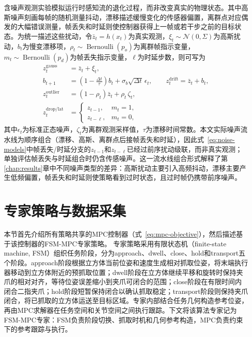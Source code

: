 含噪声观测实验模拟运行时感知流的退化过程，而非改变真实的物理状态。其中高斯噪声刻画每帧的随机测量抖动，漂移描述缓慢变化的传感器偏置，离群点对应偶发的大幅错误测量，帧丢失和时延则使控制器获得上一帧或若干步之前的目标状态。为统一描述这些扰动，令$\bar{z}_t=h(x_t)$为真实观测，$\xi_t\sim\mathcal{N}(0,\Sigma)$为高斯扰动，$b_t$为慢变漂移项，$\rho_t\sim\operatorname{Bernoulli}(p_o)$为离群帧指示变量，$m_t\sim\operatorname{Bernoulli}(p_d)$为帧丢失指示变量，$\ell$为时延步数，则可写为
\begin{align}
    z_t^{\mathrm{gauss}} &= \bar{z}_t+\xi_t, \\
    b_{t+1} &= \left(1-\frac{\Delta t}{\tau}\right)b_t+\sigma_b\sqrt{\Delta t}\,\epsilon_t,\qquad
        z_t^{\mathrm{drift}}=\bar{z}_t+b_t, \\
    z_t^{\mathrm{outlier}} &= (1-\rho_t)\bar{z}_t+\rho_t\,\zeta_t, \\
    z_t^{\mathrm{drop/lat}} &=
    \begin{cases}
        z_{t-1}, & m_t=1,\\
        z_{t-\ell}, & m_t=0,
    \end{cases}
    \label{eq:noise-models}
\end{align}
其中$\epsilon_t$为标准正态噪声，$\zeta_t$为离群观测采样值，$\tau$为漂移时间常数。本文实际噪声流水线为顺序组合（漂移、高斯、离群点后接帧丢失和时延），因此式~\eqref{eq:noise-models}中帧丢失/时延分支的$z_{t-1}$和$z_{t-\ell}$已经过前序扰动级联，而非真实观测；单独评估帧丢失与时延组合时仍含传感噪声。这一流水线组合形式解释了第\ref{chap:results}章中不同噪声类型的差异：高斯扰动主要引入高频抖动，漂移主要产生低频偏置，帧丢失和时延则使策略看到过时状态，且过时帧仍携带前序噪声。

\section{专家策略与数据采集}

本节首先介绍所有策略共享的MPC控制器（式~\eqref{eq:mpc-objective}），然后描述基于该控制器的FSM-MPC专家策略。
专家策略采用有限状态机（finite-state machine, FSM）组织任务阶段，分为approach、dwell、close、hold和transport五个阶段。approach阶段根据立方体当前位姿和速度生成相对抓取位姿，将末端执行器移动到立方体附近的预抓取位置；dwell阶段在立方体继续平移和旋转时保持夹爪的相对对齐，等待位姿误差缩小到夹爪可闭合的范围；close阶段在有限时间内闭合二指夹爪；hold阶段短暂保持闭合以确认抓取稳定；transport阶段则保持夹爪闭合，将已抓取的立方体运送至目标区域。专家内部结合任务几何构造参考位姿，再由MPC求解器在任务空间和关节空间之间执行跟踪。下文将该算法专家记为FSM-MPC专家：FSM负责阶段切换、抓取时机和几何参考构造，MPC负责约束下的参考跟踪与执行。

